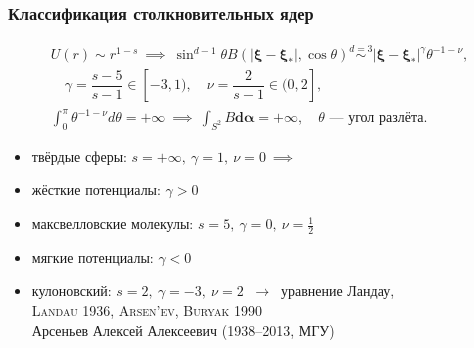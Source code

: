 \documentclass[mathserif]{beamer} %
\newcommand{\dd}{d}%
\newcommand{\bxi}{\boldsymbol{\xi}}
\newcommand{\Cite}[2][]{\alert{\textsc{#2 #1}}}
\begin{document}
\begin{frame}
    \frametitle{Классификация столкновительных ядер}
    \begin{gather*}
        U(r)\sim r^{1-s} \:\implies\: \sin^{d-1}\theta B(|\bxi-\bxi_*|,\cos\theta)
            \overset{d=3}{\sim} |\bxi-\bxi_*|^\gamma \theta^{-1-\nu}, \\
        \quad \gamma = \dfrac{s-5}{s-1}\in[-3,1), \quad \nu = \dfrac2{s-1}\in(0,2], \\
        \int_0^\pi \theta^{-1-\nu}\dd\theta = +\infty\:\implies\:\int_{S^2} B\boldsymbol{\dd\alpha} = +\infty,
            \quad \theta\text{ --- угол разлёта.}
    \end{gather*}
    \vspace{-10pt}
    \begin{itemize}
        \item твёрдые сферы: \(s=+\infty,\:\gamma=1,\:\nu=0 \:\implies\:\) \framebox{\(B=|\bxi-\bxi_*|\)}
        \item жёсткие потенциалы: \(\gamma>0\)
        \item максвелловские молекулы: \(s=5,\:\gamma=0,\:\nu=\frac12\)
        \item мягкие потенциалы: \(\gamma<0\)
        \item кулоновский: \(s=2,\:\gamma=-3,\:\nu=2\) \(\:\longrightarrow\:\) уравнение Ландау,\\
            \Cite[1936]{Landau}, \Cite[1990]{Arsen'ev, Buryak} \\
            {\footnotesize Арсеньев Алексей Алексеевич (1938--2013, МГУ)}
    \end{itemize}
\end{frame}
\end{document}
